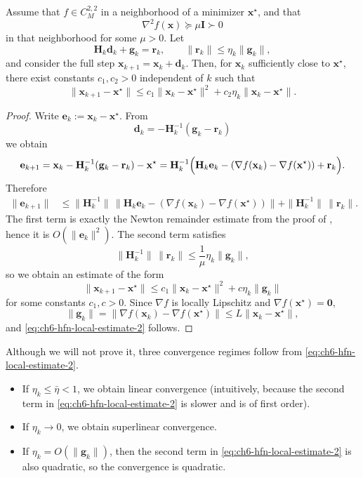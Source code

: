 \begin{theorem}
\label{thm:ch6-hfn-local}
Assume that $f\in C_M^{2,2}$ in a neighborhood of a minimizer
$\mathbf{x}^\star$, and that
\[
  \nabla^2 f(\mathbf{x})\succeq \mu \mathbf{I}\succ 0
\]
in that neighborhood for some $\mu>0$. Let
\[
  \mathbf{H}_k\mathbf{d}_k+\mathbf{g}_k=\mathbf{r}_k,
  \qquad
  \|\mathbf{r}_k\|\le \eta_k \|\mathbf{g}_k\|,
\]
and consider the full step $\mathbf{x}_{k+1}=\mathbf{x}_k+\mathbf{d}_k$.
Then, for $\mathbf{x}_k$ sufficiently close to $\mathbf{x}^\star$, there
exist constants $c_1,c_2>0$ independent of $k$ such that
\begin{equation}
  \label{eq:ch6-hfn-local-estimate-2}
  \|\mathbf{x}_{k+1}-\mathbf{x}^\star\|
  \le c_1 \|\mathbf{x}_k-\mathbf{x}^\star\|^2
  +c_2 \eta_k \|\mathbf{x}_k-\mathbf{x}^\star\|.
\end{equation}
\end{theorem}
\begin{proof}
Write $\mathbf{e}_k:=\mathbf{x}_k-\mathbf{x}^\star$. From
\[
  \mathbf{d}_k=-\mathbf{H}_k^{-1}(\mathbf{g}_k-\mathbf{r}_k)
\]
we obtain
\[
  \mathbf{e}_{k+1}
  =\mathbf{x}_k-\mathbf{H}_k^{-1}(\mathbf{g}_k-\mathbf{r}_k)-\mathbf{x}^\star
  =\mathbf{H}_k^{-1}
  \Bigl(
    \mathbf{H}_k\mathbf{e}_k
    -(\nabla f(\mathbf{x}_k)-\nabla f(\mathbf{x}^\star))
    +\mathbf{r}_k
  \Bigr).
\]
Therefore
\begin{align*}
  \|\mathbf{e}_{k+1}\|
  &\le \|\mathbf{H}_k^{-1}\|
  \,\|\mathbf{H}_k\mathbf{e}_k-(\nabla f(\mathbf{x}_k)-\nabla f(\mathbf{x}^\star))\|
  +\|\mathbf{H}_k^{-1}\|\,\|\mathbf{r}_k\|.
\end{align*}
The first term is exactly the Newton remainder estimate from the proof of
, hence it is $O(\|\mathbf{e}_k\|^2)$. The
second term satisfies
\[
  \|\mathbf{H}_k^{-1}\|\,\|\mathbf{r}_k\|
  \le \frac{1}{\mu}\eta_k \|\mathbf{g}_k\|,
\]
so we obtain an estimate of the form
\[
  \|\mathbf{x}_{k+1}-\mathbf{x}^\star\|
  \le c_1 \|\mathbf{x}_k-\mathbf{x}^\star\|^2
  +c \eta_k \|\mathbf{g}_k\|
\]
for some constants $c_1,c>0$. Since $\nabla f$ is locally Lipschitz and
$\nabla f(\mathbf{x}^\star)=\mathbf{0}$,
\[
  \|\mathbf{g}_k\|
  =\|\nabla f(\mathbf{x}_k)-\nabla f(\mathbf{x}^\star)\|
  \le L\|\mathbf{x}_k-\mathbf{x}^\star\|,
\]
and \eqref{eq:ch6-hfn-local-estimate-2} follows.
\end{proof}

Although we will not prove it, three convergence regimes follow from
\eqref{eq:ch6-hfn-local-estimate-2}.
\begin{itemize}
  \item If $\eta_k\le \bar\eta<1$, we obtain linear convergence (intuitively, because the second term in
    \cref{eq:ch6-hfn-local-estimate-2} is slower and is of first order).
  \item If $\eta_k\to 0$, we obtain superlinear convergence.
  \item If $\eta_k=O(\|\mathbf{g}_k\|)$, then the second term in
  \eqref{eq:ch6-hfn-local-estimate-2} is also quadratic, so the convergence is
  quadratic.
\end{itemize}

